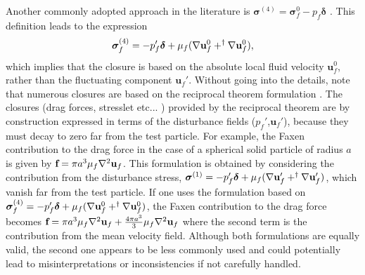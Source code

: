Another commonly adopted approach in the literature is $\bm \sigma ^{(4)} = \bm \sigma _f ^0 - p_f\bm\delta$ \citep{simonin1996,lhuillier2009rheology,morel2015mathematical,guazzelli2018rheology}.
This definition leads to the expression
\begin{equation}
    \bm\sigma_f^{(4)}  = -p_f' \bm\delta + \mu_f (\mathbf{\nabla} \textbf{u}_f^0 + ^\dagger \mathbf{\nabla} \textbf{u}_f^0),
\end{equation}
which implies that the closure is based on the absolute local fluid velocity $\textbf{u}_f^0$, rather than the fluctuating component $\textbf{u}_f'$.
Without going into the details, note that numerous closures are based on the reciprocal theorem formulation \citep{kim2013microhydrodynamics,stone2001inertial,raja2010inertial}. %
The closures (drag forces, stresslet etc... ) provided by the reciprocal theorem are by construction expressed in terms of the disturbance fields ($p_f'$,$\textbf{u}_f'$), because they must decay to zero far from the test particle. 
For example, the Faxen contribution to the drag force in the case of a spherical solid particle of radius $a$ is given by $\textbf{f} = \pi a^3 \mu_f \mathbf{\nabla}^2 \textbf{u}_f$. 
This formulation is obtained  by considering the contribution from the disturbance stress, $\bm\sigma ^{(1)}  = -p_f' \bm\delta + \mu_f (\mathbf{\nabla} \textbf{u}_f' + ^\dagger \mathbf{\nabla} \textbf{u}_f')$, which vanish far from the test particle. 
If one uses the formulation based on $\bm\sigma_f^{(4)}  = -p_f' \bm\delta + \mu_f (\mathbf{\nabla} \textbf{u}_f^0 + ^\dagger \mathbf{\nabla} \textbf{u}_f^0)$, the Faxen contribution to the drag force becomes $\textbf{f} = \pi a^3 \mu_f \mathbf{\nabla}^2 \textbf{u}_f + \frac{4\pi a^3}{3}\mu_f \mathbf{\nabla}^2 \textbf{u}_f$ where the second term is the contribution from the mean velocity field.
Although both formulations are equally valid, the second one appears to be less commonly used and could potentially lead to misinterpretations or inconsistencies if not carefully handled. 


